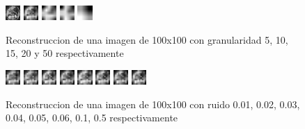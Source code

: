 \begin{figure}[H]
    \centering
\includegraphics[width=0.05\textwidth]{img/tomo_granu_5.png}
\includegraphics[width=0.05\textwidth]{img/tomo_granu_10.png}
\includegraphics[width=0.05\textwidth]{img/tomo_granu_20.png}
\includegraphics[width=0.05\textwidth]{img/tomo_granu_25.png}
\includegraphics[width=0.05\textwidth]{img/tomo_granu_50.png}
	\caption{Reconstruccion de una imagen de 100x100 con granularidad 5, 10, 15, 20 y 50 respectivamente}
	\label{fig:ruido}
\end{figure}


\begin{figure}[H]
    \centering
\includegraphics[width=0.05\textwidth]{img/tomo_ruido001.png}
\includegraphics[width=0.05\textwidth]{img/tomo_ruido002.png}
\includegraphics[width=0.05\textwidth]{img/tomo_ruido003.png}
\includegraphics[width=0.05\textwidth]{img/tomo_ruido004.png}
\includegraphics[width=0.05\textwidth]{img/tomo_ruido005.png}
\includegraphics[width=0.05\textwidth]{img/tomo_ruido006.png}
\includegraphics[width=0.05\textwidth]{img/tomo_ruido01.png}
\includegraphics[width=0.05\textwidth]{img/tomo_ruido05.png}
	\caption{Reconstruccion de una imagen de 100x100 con ruido 0.01, 0.02, 0.03, 0.04, 0.05, 0.06, 0.1, 0.5 respectivamente}
	\label{fig:emisores}
\end{figure}